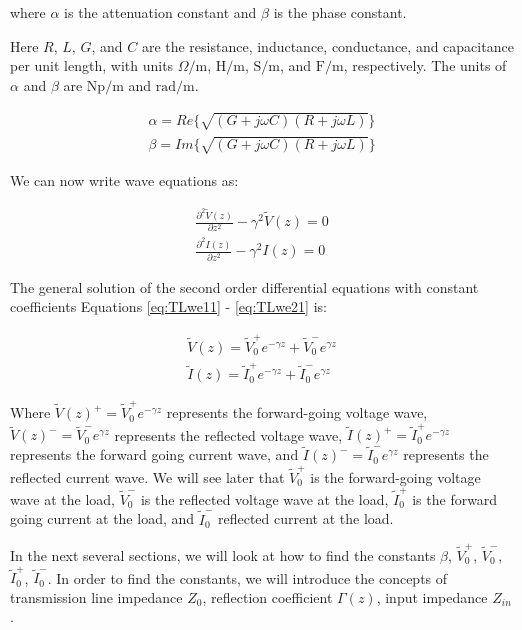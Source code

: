 \documentclass{ximera}
\begin{document}
where $\alpha$ is the attenuation constant and $\beta$ is the phase
constant.

Here $R$, $L$, $G$, and $C$ are the resistance, inductance,
conductance, and capacitance per unit length, with units
$\Omega/\mathrm{m}$, $\mathrm{H}/\mathrm{m}$,
$\mathrm{S}/\mathrm{m}$, and $\mathrm{F}/\mathrm{m}$,
respectively. The units of $\alpha$ and $\beta$ are
$\mathrm{Np}/\mathrm{m}$ and $\mathrm{rad}/\mathrm{m}$.

\begin{eqnarray}
\alpha=Re\{ \sqrt{(G+j\omega C)  (R+j\omega L)  }  \} \nonumber \\ \nonumber
\beta = Im\{ \sqrt{(G+j\omega C)  (R+j\omega L)  }  \}
\end{eqnarray}

We can now write wave equations as:


\begin{eqnarray}
\frac{\partial^2 \tilde{V}(z)}{\partial z^2} -\gamma^2
 \tilde{V}(z)=0  \label{eq:TLwe11} \\ 
\frac{\partial^2 I(z)}{\partial z^2}- \gamma^2
I(z)=0 \label{eq:TLwe21}
\end{eqnarray}


The general solution of the second order differential equations with constant coefficients
Equations \ref{eq:TLwe11} - \ref{eq:TLwe21}   is:

\begin{eqnarray}
\tilde{V}(z)=\tilde{V}_0^+ e^{-\gamma z} + \tilde{V}_0^- e^{\gamma z} \nonumber \\ \nonumber
\tilde{I}(z)=\tilde{I}_0^+ e^{-\gamma z} + \tilde{I}_0^- e^{\gamma z}
\end{eqnarray}

Where $\tilde{V}(z)^+=\tilde{V}_0^+ e^{-\gamma z}$ represents the forward-going voltage wave, $\tilde{V}(z)^-=\tilde{V}_0^- e^{\gamma z}$ represents the reflected voltage wave, $\tilde{I}(z)^+=\tilde{I}_0^+ e^{-\gamma z}$ represents the forward going current wave, and $\tilde{I}(z)^-=\tilde{I}_0^- e^{\gamma z}$ represents the reflected current wave. We will see later that $\tilde{V}_0^+$ is the forward-going voltage wave at the load, $\tilde{V}_0^-$ 
is the reflected voltage wave at the load, $\tilde{I}_0^+$ is the forward going current at the load, and $\tilde{I}_0^-$ reflected current at the load.


In the next several sections, we will look at how to find the constants $\beta$, $\tilde{V}_0^+  $, $ \tilde{V}_0^-$, $\tilde{I}_0^+ $, $\tilde{I}_0^-$. In order to find the constants, we will introduce the concepts of transmission line impedance $Z_0$, reflection coefficient $\Gamma(z)$, input impedance $Z_{in}$. 
\end{document}
